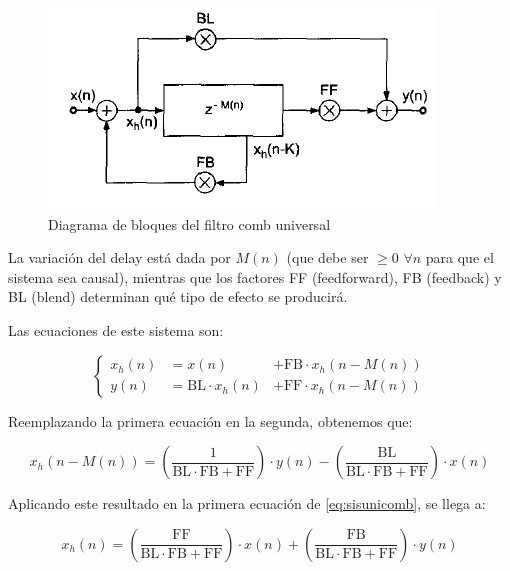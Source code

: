 \documentclass[assd_tp2_main.tex]{subfiles}
\begin{document}
\begin{figure}[!htb]
	\centering
	\includegraphics[scale=1]{graficos/EJ8/rochi/unicomb.png}
	\caption{Diagrama de bloques del filtro comb universal}
	\label{fig:unicomb}
\end{figure}


La variaci\'on del delay est\'a dada por $M(n)$ (que debe ser $\geq 0$ $\forall n$ para que el sistema sea causal), mientras que los factores FF (feedforward), FB (feedback) y BL (blend) determinan qu\'e tipo de efecto se producir\'a.

Las ecuaciones de este sistema son:

\begin{equation}
	\left\{
	\begin{aligned}
	x_h(n) 	&= x(n)& + \text{FB} \cdot x_h(n-M(n))	\\
	y(n) 	&= \text{BL} \cdot x_h(n) &+ 
				\text{FF} \cdot x_h(n-M(n))
	\end{aligned}
	\right.
	\label{eq:sisunicomb}
\end{equation}

 Reemplazando la primera ecuaci\'on en la segunda, obtenemos que:
 
 \begin{equation*}
 	x_h(n-M(n)) =  
 	\left( \frac{1}{\text{BL}\cdot \text{FB} + \text{FF}}\right) \cdot y(n) -
 	\left( \frac{\text{BL}}{\text{BL}\cdot \text{FB} + \text{FF}}\right) \cdot x(n) 
	\label{eq:xhk} 
 \end{equation*}
 
 
 Aplicando este resultado en la primera ecuaci\'on de \ref{eq:sisunicomb}, se llega a:
 
 \begin{equation}
 	x_h(n) = 
 	\left( \frac{\text{FF}}{\text{BL}\cdot \text{FB} + \text{FF}}\right) \cdot x(n) +
 	\left( \frac{\text{FB}}{\text{BL}\cdot \text{FB} + \text{FF}}\right) \cdot y(n) 
 	\label{eq:xh}
 \end{equation}
\end{document}
